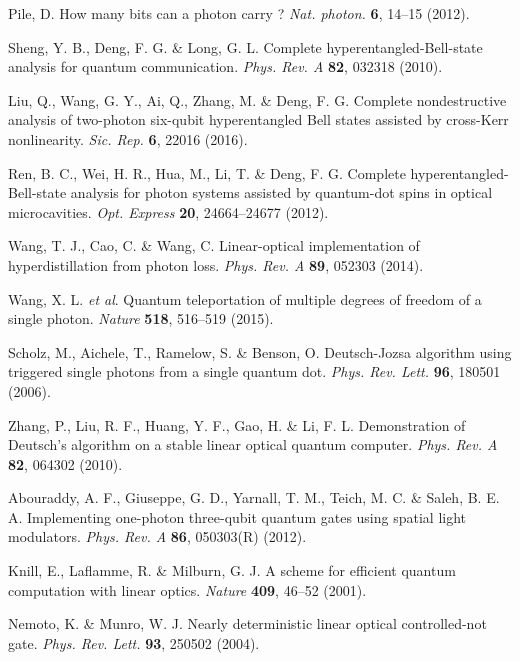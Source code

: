 \documentclass[showpacs,preprintnumbers,showkeys,amsmath,amssymb]{revtex4}%
\begin{document}
\begin{thebibliography}{61}

 Pile, D. How many bits can a photon carry ? \emph{Nat. photon.} \textbf{6}, 14--15 (2012).

 Sheng, Y. B., Deng, F. G. \& Long, G. L. Complete hyperentangled-Bell-state analysis for quantum communication. \emph{Phys. Rev. A} \textbf{82}, 032318 (2010).


Liu, Q., Wang, G. Y., Ai, Q., Zhang, M. \&  Deng, F. G. Complete nondestructive
analysis of two-photon six-qubit hyperentangled Bell states assisted by cross-Kerr nonlinearity. \emph{Sic. Rep.} \textbf{6}, 22016 (2016).


 Ren, B. C., Wei, H. R., Hua, M., Li, T. \& Deng, F. G. Complete hyperentangled-Bell-state analysis for photon systems assisted by quantum-dot spins in optical microcavities. \emph{Opt. Express} \textbf{20}, 24664--24677 (2012).

 Wang, T. J., Cao, C. \&  Wang, C. Linear-optical implementation of hyperdistillation from photon loss. \emph{Phys. Rev. A} \textbf{89}, 052303 (2014).




 Wang, X. L. \emph{et al}. Quantum teleportation of multiple degrees of freedom of a single photon. \emph{Nature} \textbf{518}, 516--519 (2015).

 Scholz, M., Aichele, T., Ramelow, S. \& Benson, O. Deutsch-Jozsa algorithm using triggered single photons from a single quantum dot. \emph{Phys. Rev. Lett.} \textbf{96}, 180501 (2006).

 Zhang, P., Liu, R. F., Huang, Y. F., Gao, H. \& Li, F. L. Demonstration of Deutsch's algorithm on a stable linear optical quantum computer. \emph{Phys. Rev. A} \textbf{82}, 064302 (2010).

 Abouraddy, A. F., Giuseppe, G. D., Yarnall, T. M., Teich, M. C. \& Saleh, B. E. A. Implementing one-photon three-qubit quantum gates using spatial light modulators. \emph{Phys. Rev. A} \textbf{86}, 050303(R) (2012).

 Knill, E., Laflamme, R. \& Milburn, G. J. A scheme for efficient quantum computation with linear optics. \emph{Nature} \textbf{409}, 46--52 (2001).

 Nemoto, K. \& Munro, W. J. Nearly deterministic linear optical controlled-not gate. \emph{Phys. Rev. Lett.} \textbf{93}, 250502 (2004).


\end{thebibliography}
\end{document}
